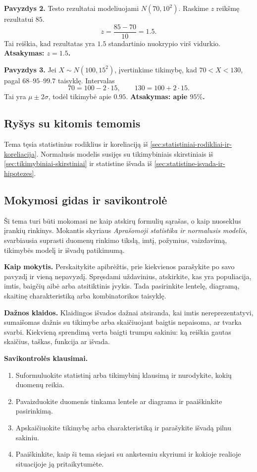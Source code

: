 \textbf{Pavyzdys 2.} Testo rezultatai modeliuojami $N(70,10^2)$. Raskime $z$ reikšmę rezultatui $85$. 
\[
z=\frac{85-70}{10}=1.5.
\]
Tai reiškia, kad rezultatas yra $1.5$ standartinio nuokrypio virš vidurkio. \textbf{Atsakymas: $z=1.5$.}

\textbf{Pavyzdys 3.} Jei $X\sim N(100,15^2)$, įvertinkime tikimybę, kad $70<X<130$, pagal $68$--$95$--$99.7$ taisyklę. Intervalas
\[
70=100-2\cdot15,\qquad 130=100+2\cdot15.
\]
Tai yra $\mu\pm2\sigma$, todėl tikimybė apie $0.95$. \textbf{Atsakymas: apie $95\%$.}

\subsection{Ryšys su kitomis temomis}

Tema tęsia statistinius rodiklius ir koreliaciją iš \ref{sec:statistiniai-rodikliai-ir-koreliacija}. Normalusis modelis susijęs su tikimybiniais skirstiniais iš \ref{sec:tikimybiniai-skirstiniai} ir statistine išvada iš \ref{sec:statistine-isvada-ir-hipotezes}.

\subsection{Mokymosi gidas ir savikontrolė}

Ši tema turi būti mokomasi ne kaip atskirų formulių sąrašas, o kaip nuoseklus įrankių rinkinys. Mokantis skyriaus \textit{Aprašomoji statistika ir normalusis modelis}, svarbiausia suprasti duomenų rinkimo tikslą, imtį, požymius, vaizdavimą, tikimybės modelį ir išvadų patikimumą.

\textbf{Kaip mokytis.} Perskaitykite apibrėžtis, prie kiekvienos parašykite po savo pavyzdį ir vieną nepavyzdį. Spręsdami uždavinius, atskirkite, kas yra populiacija, imtis, baigčių aibė arba atsitiktinis įvykis. Tada pasirinkite lentelę, diagramą, skaitinę charakteristiką arba kombinatorikos taisyklę.

\textbf{Dažnos klaidos.} Klaidingos išvados dažnai atsiranda, kai imtis nereprezentatyvi, sumaišomas dažnis su tikimybe arba skaičiuojant baigtis nepaisoma, ar tvarka svarbi. Kiekvieną sprendimą verta baigti trumpu sakiniu: ką reiškia gautas skaičius, taškas, funkcija ar išvada.

\textbf{Savikontrolės klausimai.}
\begin{enumerate}[label=\arabic*.]
\item Suformuluokite statistinį arba tikimybinį klausimą ir nurodykite, kokių duomenų reikia.
\item Pavaizduokite duomenis tinkama lentele ar diagrama ir paaiškinkite pasirinkimą.
\item Apskaičiuokite tikimybę arba charakteristiką ir parašykite išvadą pilnu sakiniu.
\item Paaiškinkite, kaip ši tema siejasi su ankstesniu skyriumi ir kokioje realioje situacijoje ją pritaikytumėte.
\end{enumerate}

